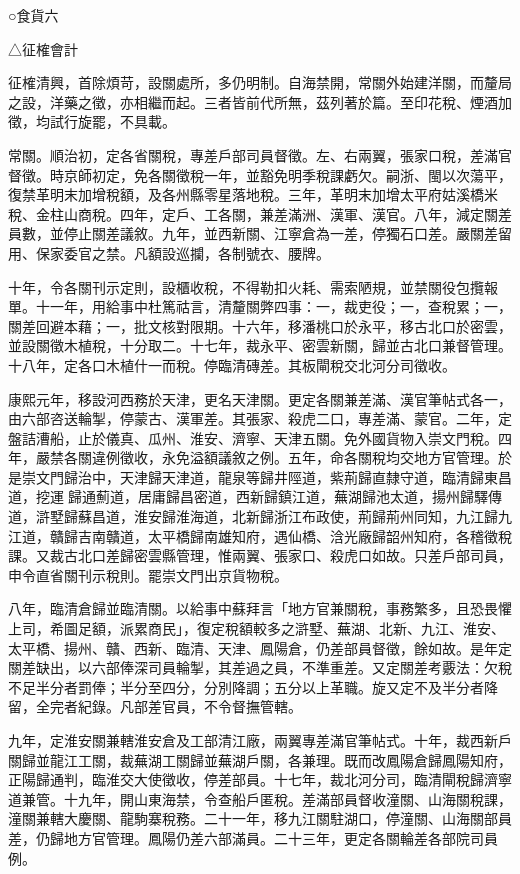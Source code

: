 
\begin{pinyinscope}
○食貨六

△征榷會計

征榷清興，首除煩苛，設關處所，多仍明制。自海禁開，常關外始建洋關，而釐局之設，洋藥之徵，亦相繼而起。三者皆前代所無，茲列著於篇。至印花稅、煙酒加徵，均試行旋罷，不具載。

常關。順治初，定各省關稅，專差戶部司員督徵。左、右兩翼，張家口稅，差滿官督徵。時京師初定，免各關徵稅一年，並豁免明季稅課虧欠。嗣浙、閩以次蕩平，復禁革明末加增稅額，及各州縣零星落地稅。三年，革明末加增太平府姑溪橋米稅、金柱山商稅。四年，定戶、工各關，兼差滿洲、漢軍、漢官。八年，減定關差員數，並停止關差議敘。九年，並西新關、江寧倉為一差，停獨石口差。嚴關差留用、保家委官之禁。凡額設巡攔，各制號衣、腰牌。

十年，令各關刊示定則，設櫃收稅，不得勒扣火耗、需索陋規，並禁關役包攬報單。十一年，用給事中杜篤祜言，清釐關弊四事：一，裁吏役；一，查稅累；一，關差回避本藉；一，批文核對限期。十六年，移潘桃口於永平，移古北口於密雲，並設關徵木植稅，十分取二。十七年，裁永平、密雲新關，歸並古北口兼督管理。十八年，定各口木植什一而稅。停臨清磚差。其板閘稅交北河分司徵收。

康熙元年，移設河西務於天津，更名天津關。更定各關兼差滿、漢官筆帖式各一，由六部咨送輪掣，停蒙古、漢軍差。其張家、殺虎二口，專差滿、蒙官。二年，定盤詰漕船，止於儀真、瓜州、淮安、濟寧、天津五關。免外國貨物入崇文門稅。四年，嚴禁各關違例徵收，永免溢額議敘之例。五年，命各關稅均交地方官管理。於是崇文門歸治中，天津歸天津道，龍泉等歸井陘道，紫荊歸直隸守道，臨清歸東昌道，挖運歸通薊道，居庸歸昌密道，西新歸鎮江道，蕪湖歸池太道，揚州歸驛傳道，滸墅歸蘇昌道，淮安歸淮海道，北新歸浙江布政使，荊歸荊州同知，九江歸九江道，贛歸吉南贛道，太平橋歸南雄知府，遇仙橋、浛光廠歸韶州知府，各稽徵稅課。又裁古北口差歸密雲縣管理，惟兩翼、張家口、殺虎口如故。只差戶部司員，申令直省關刊示稅則。罷崇文門出京貨物稅。

八年，臨清倉歸並臨清關。以給事中蘇拜言「地方官兼關稅，事務繁多，且恐畏懼上司，希圖足額，派累商民」，復定稅額較多之滸墅、蕪湖、北新、九江、淮安、太平橋、揚州、贛、西新、臨清、天津、鳳陽倉，仍差部員督徵，餘如故。是年定關差缺出，以六部俸深司員輪掣，其差過之員，不準重差。又定關差考覈法：欠稅不足半分者罰俸；半分至四分，分別降調；五分以上革職。旋又定不及半分者降留，全完者紀錄。凡部差官員，不令督撫管轄。

九年，定淮安關兼轄淮安倉及工部清江廠，兩翼專差滿官筆帖式。十年，裁西新戶關歸並龍江工關，裁蕪湖工關歸並蕪湖戶關，各兼理。既而改鳳陽倉歸鳳陽知府，正陽歸通判，臨淮交大使徵收，停差部員。十七年，裁北河分司，臨清閘稅歸濟寧道兼管。十九年，開山東海禁，令查船戶匿稅。差滿部員督收潼關、山海關稅課，潼關兼轄大慶關、龍駒寨稅務。二十一年，移九江關駐湖口，停潼關、山海關部員差，仍歸地方官管理。鳳陽仍差六部滿員。二十三年，更定各關輪差各部院司員例。


\end{pinyinscope}
